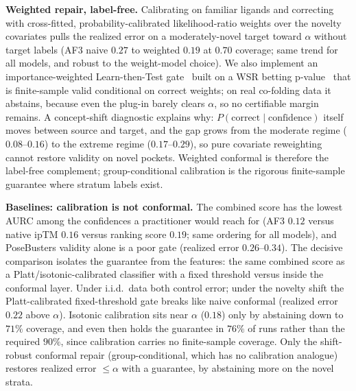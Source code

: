 \documentclass[10pt]{article}
\begin{document}
\textbf{Weighted repair, label-free.} Calibrating on familiar ligands and correcting with cross-fitted,
probability-calibrated likelihood-ratio weights over the novelty covariates pulls the realized error
on a moderately-novel target toward $\alpha$ without target labels (AF3 naive $0.27$ to weighted $0.19$
at $0.70$ coverage; same trend for all models, and robust to the weight-model choice). We also
implement an importance-weighted Learn-then-Test gate~\citep{almeida2025} built on a WSR betting
p-value~\citep{waudbysmith2024} that is finite-sample valid conditional on correct weights; on real
co-folding data it abstains, because even the plug-in barely clears $\alpha$, so no certifiable margin
remains. A concept-shift diagnostic explains why: $P(\text{correct}\mid\text{confidence})$ itself moves
between source and target, and the gap grows from the moderate regime ($0.08$--$0.16$) to the extreme
regime ($0.17$--$0.29$), so pure covariate reweighting cannot restore validity on novel pockets.
Weighted conformal is therefore the label-free complement; group-conditional calibration is the
rigorous finite-sample guarantee where stratum labels exist.

\textbf{Baselines: calibration is not conformal.} The combined score has the lowest AURC among the
confidences a practitioner would reach for (AF3 $0.12$ versus native ipTM $0.16$ versus ranking score
$0.19$; same ordering for all models), and PoseBusters validity alone is a poor gate (realized error
$0.26$--$0.34$). The decisive comparison isolates the guarantee from the features: the same combined
score as a Platt/isotonic-calibrated classifier with a fixed threshold versus inside the conformal
layer. Under i.i.d.\ data both control error; under the novelty shift the Platt-calibrated
fixed-threshold gate breaks like naive conformal (realized error $0.22$ above $\alpha$). Isotonic
calibration sits near $\alpha$ ($0.18$) only by abstaining down to $71\%$ coverage, and even then holds
the guarantee in $76\%$ of runs rather than the required $90\%$, since calibration carries no
finite-sample coverage. Only the shift-robust conformal repair (group-conditional, which has no
calibration analogue) restores realized error $\le\alpha$ with a guarantee, by abstaining more on the
novel strata.
\end{document}
